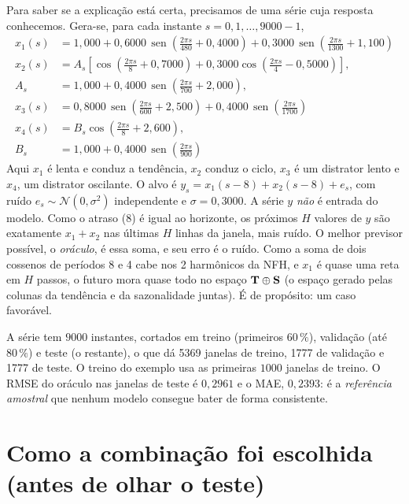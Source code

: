 \documentclass[11pt,a4paper]{article}
\DeclareMathOperator{\sen}{sen}
\begin{document}
Para saber se a explicação está certa, precisamos de uma série cuja resposta conhecemos. Gera-se, para cada instante $s=0,1,\dots,9000-1$,
\begin{align*}
x_1(s) &= 1,000 + 0,6000\,\sen\!\left(\tfrac{2\pi s}{480}+0,4000\right) + 0,3000\,\sen\!\left(\tfrac{2\pi s}{1300}+1,100\right) \\
x_2(s) &= A_s\left[\cos\!\left(\tfrac{2\pi s}{8}+0,7000\right) + 0,3000\cos\!\left(\tfrac{2\pi s}{4}-0,5000\right)\right],\\
A_s &= 1,000+0,4000\,\sen\!\left(\tfrac{2\pi s}{700}+2,000\right),\\
x_3(s) &= 0,8000\,\sen\!\left(\tfrac{2\pi s}{600}+2,500\right) + 0,4000\,\sen\!\left(\tfrac{2\pi s}{1700}\right)\\
x_4(s) &= B_s\cos\!\left(\tfrac{2\pi s}{8}+2,600\right),\\
B_s &= 1,000+0,4000\,\sen\!\left(\tfrac{2\pi s}{900}\right)
\end{align*}
Aqui $x_1$ é lenta e conduz a tendência, $x_2$ conduz o ciclo, $x_3$ é um distrator lento e $x_4$, um distrator oscilante. O alvo é $y_s = x_1(s-8)+x_2(s-8)+e_s$, com ruído $e_s\sim\mathcal N(0,\sigma^2)$ independente e $\sigma=0,3000$. A série $y$ \emph{não} é entrada do modelo. Como o atraso ($8$) é igual ao horizonte, os próximos $H$ valores de $y$ são exatamente $x_1+x_2$ nas últimas $H$ linhas da janela, mais ruído. O melhor previsor possível, o \emph{oráculo}, é essa soma, e seu erro é o ruído. Como a soma de dois cossenos de períodos 8 e 4 cabe nos 2 harmônicos da NFH, e $x_1$ é quase uma reta em $H$ passos, o futuro mora quase todo no espaço $\mathbf{T}\oplus\mathbf{S}$ (o espaço gerado pelas colunas da tendência e da sazonalidade juntas). É de propósito: um caso favorável.

A série tem $9000$ instantes, cortados em treino (primeiros $60\,\%$), validação (até $80\,\%$) e teste (o restante), o que dá 5369 janelas de treino, 1777 de validação e 1777 de teste. O treino do exemplo usa as primeiras $1000$ janelas de treino. O RMSE do oráculo nas janelas de teste é $0,2961$ e o MAE, $0,2393$: é a \emph{referência amostral} que nenhum modelo consegue bater de forma consistente.

\section{Como a combinação foi escolhida (antes de olhar o teste)}\label{sec:selecao}
\end{document}
